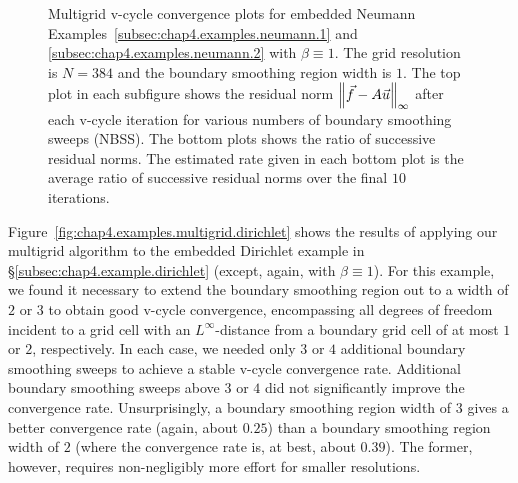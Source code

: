 \setlength{\figurewidth}{0.50\textwidth}
\begin{figure}[htbp]
\centering
{}
\caption{Multigrid v-cycle convergence plots for embedded Neumann Examples~\ref{subsec:chap4.examples.neumann.1} and \ref{subsec:chap4.examples.neumann.2} with $\beta \equiv 1$. The grid resolution is $N = 384$ and the boundary smoothing region width is $1$. The top plot in each subfigure shows the residual norm $\left\lVert  \vec{f} - A\vec{u}  \right\rVert_{\infty}$ after each v-cycle iteration for various numbers of boundary smoothing sweeps (NBSS). The bottom plots shows the ratio of successive residual norms. The estimated rate given in each bottom plot is the average ratio of successive residual norms over the final $10$ iterations.}
\label{fig:chap4.examples.multigrid.neumann}
\end{figure}

Figure~\ref{fig:chap4.examples.multigrid.dirichlet} shows the results of applying our multigrid algorithm to the embedded Dirichlet example in \S\ref{subsec:chap4.example.dirichlet} (except, again, with $\beta \equiv 1$). For this example, we found it necessary to extend the boundary smoothing region out to a width of $2$ or $3$ to obtain good v-cycle convergence, encompassing all degrees of freedom incident to a grid cell with an $L^{\infty}$-distance from a boundary grid cell of at most $1$ or $2$, respectively. In each case, we needed only $3$ or $4$ additional boundary smoothing sweeps to achieve a stable v-cycle convergence rate. Additional boundary smoothing sweeps above $3$ or $4$ did not significantly improve the convergence rate. Unsurprisingly, a boundary smoothing region width of $3$ gives a better convergence rate (again, about $0.25$) than a boundary smoothing region width of $2$ (where the convergence rate is, at best, about $0.39$). The former, however, requires non-negligibly more effort for smaller resolutions.

